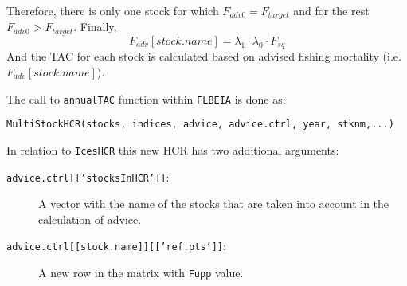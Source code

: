   Therefore, there is only one stock for which $F_{adv0} = F_{target}$ and for the rest $F_{adv0} > F_{target}$.
  Finally, 
    \begin{equation}
    	F_{adv}[stock.name] = \lambda_1 \cdot \lambda_0 \cdot F_{sq}
    \end{equation}
  And the TAC for each stock is calculated based on advised fishing mortality (i.e. $F_{adv}[stock.name]$).
  
  The call to \texttt{annualTAC} function within \texttt{FLBEIA} is done as:
	
	\begin{center}
		\texttt{MultiStockHCR(stocks, indices, advice, advice.ctrl, year, stknm,...)} 
	\end{center}
	
	  In relation to \texttt{IcesHCR} this new HCR has two additional arguments:
	\begin{description}
      \item[\texttt{advice.ctrl[['stocksInHCR']]}:] A vector with the name of the stocks that are taken into account in the calculation of advice.
		  \item[\texttt{advice.ctrl[[stock.name]][['ref.pts']]}:] A new row in the matrix with \texttt{Fupp} value.
	\end{description}

